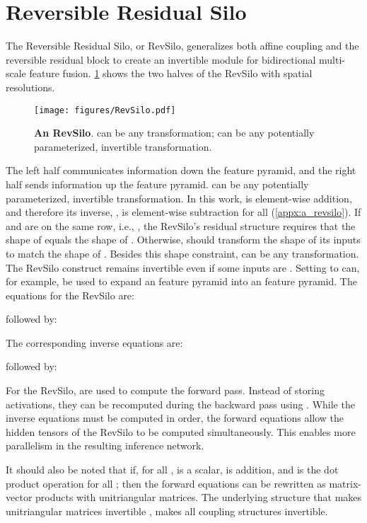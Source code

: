 \documentclass{article}
\begin{document}
\section{Reversible Residual Silo}
\label{sec:revsilo}

The Reversible Residual Silo, or RevSilo, generalizes both affine coupling \cite{dinh2014nice} and the reversible residual block \cite{gomez2017reversible} to create an invertible module for bidirectional multi-scale feature fusion.
\cref{fig:c_silo} shows the two halves of the RevSilo with  spatial resolutions.

\begin{figure}[h]
    \centering
    \texttt{[image: figures/RevSilo.pdf]}
    \caption{
        \textbf{An  RevSilo}.
         can be any transformation;  can be any potentially parameterized, invertible transformation.
    }
    \label{fig:c_silo}
    \vskip -5pt
\end{figure}

The left half communicates information down the feature pyramid, and the right half sends information up the feature pyramid.
 can be any potentially parameterized, invertible transformation.
In this work,  is element-wise addition, and therefore its inverse, , is element-wise subtraction for all  (\cref{appx:a_revsilo}).
If  and  are on the same row, i.e., , the RevSilo's residual structure requires that the shape of  equals the shape of .
Otherwise,  should transform the shape of its inputs to match the shape of .
Besides this shape constraint,  can be any transformation.
The RevSilo construct remains invertible even if some inputs are .
Setting  to  can, for example, be used to expand an  feature pyramid into an  feature pyramid.
The equations for the  RevSilo are:

followed by:

The corresponding inverse equations are:

followed by:


For the  RevSilo,  are used to compute the forward pass. 
Instead of storing activations, they can be recomputed during the backward pass using .
While the inverse equations must be computed in order, the forward equations allow the  hidden tensors of the RevSilo to be computed simultaneously.
This enables more parallelism in the resulting inference network.

It should also be noted that if, for all ,  is a scalar,  is addition, and  is the dot product operation for all ; then the forward equations can be rewritten as matrix-vector products with unitriangular matrices.
The underlying structure that makes unitriangular matrices invertible \cite{thoma2013solving}, makes all coupling structures \cite{kingma2016improved, germain2015made, papamakarios2017masked, huang2018neural, dinh2014nice, gomez2017reversible} invertible.
\end{document}
